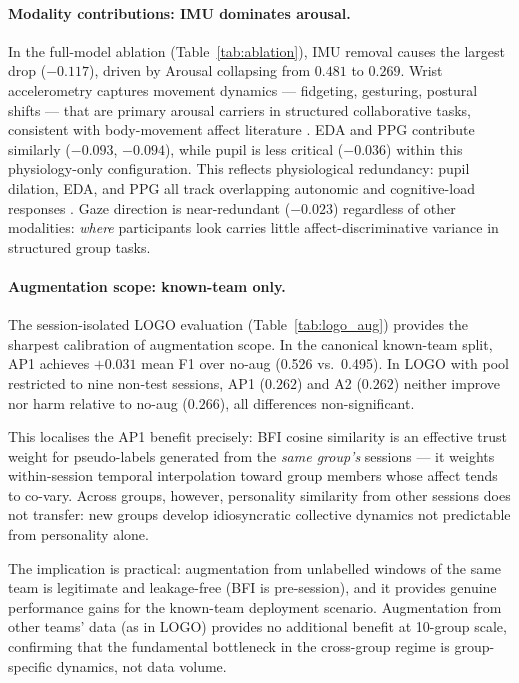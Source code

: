 \documentclass[sigconf,review,anonymous]{acmart}
\begin{document}
\paragraph{Modality contributions: IMU dominates arousal.}
In the full-model ablation (Table~\ref{tab:ablation}), IMU removal causes
the largest drop ($-0.117$), driven by Arousal collapsing from $0.481$ to
$0.269$.
Wrist accelerometry captures movement dynamics --- fidgeting, gesturing,
postural shifts --- that are primary arousal carriers in structured
collaborative tasks, consistent with body-movement affect literature
\cite{karg2013body}.
EDA and PPG contribute similarly ($-0.093$, $-0.094$), while pupil is
less critical ($-0.036$) within this physiology-only configuration.
This reflects physiological redundancy: pupil dilation, EDA, and PPG
all track overlapping autonomic and cognitive-load responses
\cite{kreibig2010autonomic,partala2003pupil,laeng2012pupillometry}.
Gaze direction is near-redundant ($-0.023$) regardless of other modalities:
\emph{where} participants look carries little affect-discriminative
variance in structured group tasks.

\paragraph{Augmentation scope: known-team only.}
The session-isolated LOGO evaluation (Table~\ref{tab:logo_aug}) provides the
sharpest calibration of augmentation scope.
In the canonical known-team split, AP1 achieves $+0.031$ mean F1 over no-aug
(0.526 vs.\ 0.495).
In LOGO with pool restricted to nine non-test sessions, AP1 ($0.262$) and A2
($0.262$) neither improve nor harm relative to no-aug ($0.266$), all
differences non-significant.

This localises the AP1 benefit precisely: BFI cosine similarity is an effective
trust weight for pseudo-labels generated from the \emph{same group's} sessions
--- it weights within-session temporal interpolation toward group members whose
affect tends to co-vary.
Across groups, however, personality similarity from other sessions does not
transfer: new groups develop idiosyncratic collective dynamics not predictable
from personality alone.

The implication is practical: augmentation from unlabelled windows of the same
team is legitimate and leakage-free (BFI is pre-session), and it provides
genuine performance gains for the known-team deployment scenario.
Augmentation from other teams' data (as in LOGO) provides no additional benefit
at 10-group scale, confirming that the fundamental bottleneck in the
cross-group regime is group-specific dynamics, not data volume.
\end{document}
